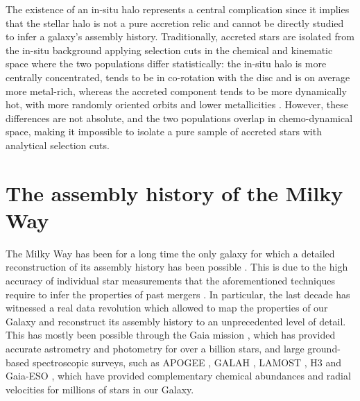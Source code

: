 The existence of an in-situ halo represents a central complication since it implies that 
the stellar halo is not a pure accretion relic and cannot be directly studied to infer a galaxy's assembly history. 
Traditionally,  accreted stars are isolated from the in-situ background applying selection cuts in the chemical
and kinematic space where the 
two populations differ statistically: the in-situ halo is more centrally concentrated, 
tends to be in co-rotation with the disc and is on average more metal-rich, whereas the accreted component tends to
be more dynamically hot, with more randomly oriented orbits and lower metallicities \citep{Carollo2007}. However, these differences 
are not absolute, and the two populations overlap in chemo-dynamical space, making it impossible to isolate a 
pure sample of accreted stars with analytical selection cuts. 



\section{The assembly history of the Milky Way}
\label{sec:intro_mwhistory}


The Milky Way has been for a long time the only galaxy for which a detailed reconstruction of its assembly history has been possible \citep{Helmi2020,Deason2024}.
This is due to the high accuracy of individual star measurements that the aforementioned techniques require to infer the properties of past mergers \citep{Helmi2020}. 
In particular, the last decade has witnessed a real data revolution which allowed to map the properties of our Galaxy 
and reconstruct its assembly history to an unprecedented level of detail. This has 
mostly been possible through the Gaia mission \citep{GaiaCollaboration2016a,GaiaCollaboration2018}, which has provided accurate astrometry 
and photometry for over a billion stars, and large ground-based spectroscopic surveys, such as APOGEE \citep{Majewski2017}, GALAH \citep{Buder2021}, LAMOST \citep{Cui2012}, 
H3 \citep{Conroy2019} and Gaia-ESO \citep{Gilmore2012}, which have provided complementary chemical abundances 
and radial velocities for millions of stars in our Galaxy.

